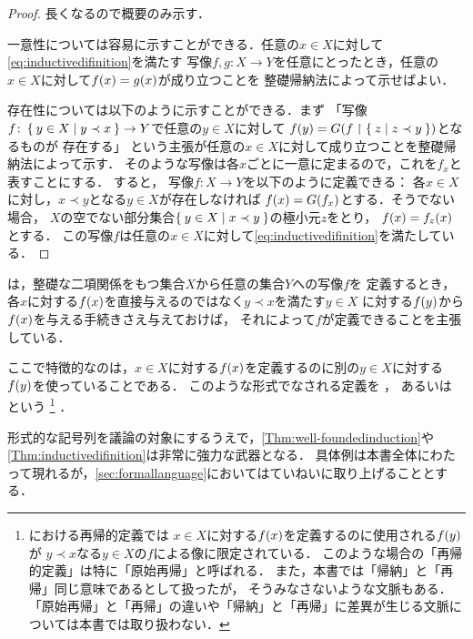 \begin{proof}
	長くなるので概要のみ示す．

	一意性については容易に示すことができる．任意の\(x \in X\)に対して\cref{eq:inductivedifinition}を満たす
	写像\(f, g \colon X \to Y\)を任意にとったとき，任意の\(x \in X\)に対して\(\apply{f}{x} = \apply{g}{x}\)が成り立つことを
	整礎帰納法によって示せばよい．

	存在性については以下のように示すことができる．まず
	「写像\(f \colon \Set{y \in X | y \prec x} \to Y\)で任意の\(y \in X\)に対して
	\(\apply{f}{y} = \apply{G}{f \restriction \Set{z | z \prec y}}\)となるものが
	存在する」
	という主張が任意の\(x \in X\)に対して成り立つことを整礎帰納法によって示す．
	そのような写像は各\(x\)ごとに一意に定まるので，これを\(f_x\)と表すことにする．
	すると，
	写像\(f \colon X \to Y\)を以下のように定義できる：
	各\(x \in X\)に対し，\(x \prec y\)となる\(y \in X\)が存在しなければ
	\(\apply{f}{x} = \apply{G}{f_x}\)とする．そうでない場合，
	\(X\)の空でない部分集合\(\Set{y \in X | x \prec y}\)の極小元\(z\)をとり，
	\(\apply{f}{x} = \apply{f_z}{x}\)とする．
	この写像\(f\)は任意の\(x \in X\)に対して\cref{eq:inductivedifinition}を満たしている．
\end{proof}

は，整礎な二項関係をもつ集合\(X\)から任意の集合\(Y\)への写像\(f\)を
定義するとき，各\(x\)に対する\(\apply{f}{x}\)を直接与えるのではなく\(y \prec x\)を満たす\(y \in X\)
に対する\(\apply{f}{y}\)から\(\apply{f}{x}\)を与える手続きさえ与えておけば，
それによって\(f\)が定義できることを主張している．

ここで特徴的なのは，\(x \in X\)に対する\(\apply{f}{x}\)を定義するのに別の\(y \in X\)に対する\(\apply{f}{y}\)を使っていることである．
このような形式でなされる定義を%
%
，
あるいは%
%
という%
\footnote{%
	における再帰的定義では
	\(x \in X\)に対する\(\apply{f}{x}\)を定義するのに使用される\(\apply{f}{y}\)が
	\(y \prec x\)なる\(y \in X\)の\(f\)による像に限定されている．
	このような場合の「再帰的定義」は特に「原始再帰」と呼ばれる．
	また，本書では「帰納」と「再帰」同じ意味であるとして扱ったが，
	そうみなさないような文脈もある．
	「原始再帰」と「再帰」の違いや「帰納」と「再帰」に差異が生じる文脈については本書では取り扱わない．
}%
．

形式的な記号列を議論の対象にするうえで，\cref{Thm:well-foundedinduction}や
\cref{Thm:inductivedifinition}は非常に強力な武器となる．
具体例は本書全体にわたって現れるが，\cref{sec:formallanguage}においてはていねいに取り上げることとする．

